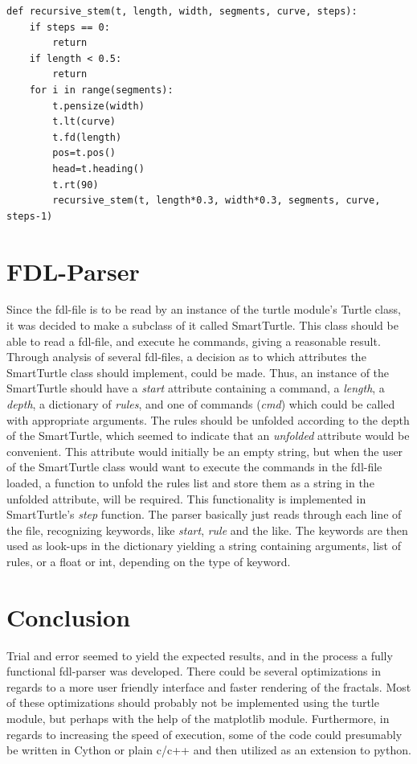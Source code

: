 \documentclass[titlepage]{article}
\begin{document}
\begin{verbatim}  
def recursive_stem(t, length, width, segments, curve, steps):
    if steps == 0:
        return
    if length < 0.5:
        return
    for i in range(segments):
        t.pensize(width)
        t.lt(curve)
        t.fd(length)
        pos=t.pos()
        head=t.heading()
        t.rt(90)
        recursive_stem(t, length*0.3, width*0.3, segments, curve, steps-1)
\end{verbatim}

\section{FDL-Parser}
Since the fdl-file is to be read by an instance of the turtle module's Turtle class, it was decided to make a subclass of it called SmartTurtle. This class should be able to read a fdl-file, and execute he commands, giving a reasonable result. Through analysis of several fdl-files, a decision as to which attributes the SmartTurtle class should implement, could be made. Thus, an instance of the SmartTurtle should have a \textit{start} attribute containing a command, a \textit{length}, a \textit{depth}, a dictionary of \textit{rules}, and one of commands (\textit{cmd}) which could be called with appropriate arguments. The rules should be unfolded according to the depth of the SmartTurtle, which seemed to indicate that an \textit{unfolded} attribute would be convenient. This attribute would initially be an empty string, but when the user of the SmartTurtle class would want to execute the commands in the fdl-file loaded, a function to unfold the rules list and store them as a string in the unfolded attribute, will be required. This functionality is implemented in SmartTurtle's \textit{step} function. The parser basically just reads through each line of the file, recognizing keywords, like \textit{start}, \textit{rule} and the like. The keywords are then used as look-ups in the dictionary yielding a string containing arguments, list of rules, or a float or int, depending on the type of keyword. 

\section{Conclusion}
Trial and error seemed to yield the expected results, and in the process a fully functional fdl-parser was developed. There could be several optimizations in regards to a more user friendly interface and faster rendering of the fractals. Most of these optimizations should probably not be implemented using the turtle module, but perhaps with the help of the matplotlib module. Furthermore, in regards to increasing the speed of execution, some of the code could presumably be written in Cython or plain c/c++ and then utilized as an extension to python.
\end{document}
